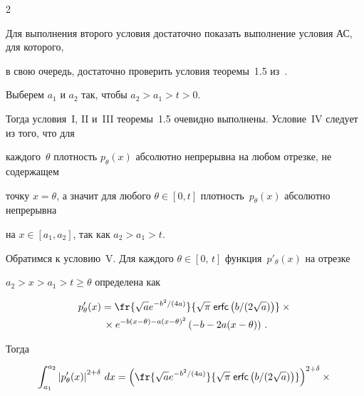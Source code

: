 \begin{multicols}{2}
\smallskip





Для выполнения второго условия достаточно показать выполнение условия АС, для которого, 


в свою очередь, достаточно проверить условия теоремы~1.5 из~\cite{chibisov}.





\smallskip





Выберем $a_1$ и $a_2$ так, чтобы $a_2 > a_1 > t > 0$. 


Тогда условия~I, II и~III теоремы~1.5 очевидно выполнены. Условие~IV следует из того, что для 


каж\-дого~$\theta$ плотность $p_{\theta}(x)$ абсолютно непрерывна на любом отрезке, не содержащем 


точку $x = \theta$, а значит для любого $\theta \in [0, t]$ плотность~$p_{\theta}(x)$ абсолютно непрерывна 


на $x \in [a_1, a_2]$, так как $a_2 > a_1 > t$.





\smallskip





Обратимся к условию~V. Для каждого $\theta \in [0,\,t]$ функция~$p'_{\theta}(x)$ на отрезке 


$a_2 > x > a_1 > t \geq \theta$ определена как


\begin{multline*}


p'_{\theta}(x) = \fr{\sqrt{a} e^{-{b^2}/(4a)}}{\sqrt{\pi}\;{\sf erfc}\left(b/(2\sqrt{a})\right)}\times{}\\


{}\times e^{-b(x - \theta) - a(x - 


\theta)^2}\left(-b - 2a(x - \theta)\right)\,.


\end{multline*}


Тогда


\begin{multline*}


\int_{a_1}^{a_2} \left|p'_{\theta}(x)\right|^{2 + \delta}\,dx =


 \left(\fr{\sqrt{a} e^{-{b^2}/(4a)}}{\sqrt{\pi}\;{\sf erfc}\left(b/(2\sqrt{a})\right)}\right)^{2+\delta}\times{}\\



\end{multline*}
\end{multicols}
